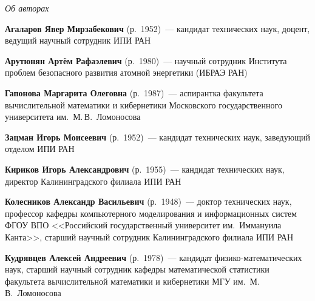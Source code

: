 \begin{center}\LARGE
\textit{Об авторах}
\end{center}
\thispagestyle{empty}

\vspace*{24pt}

\begin{multicols}{2}


\noindent
\textbf{Агаларов Явер Мирзабекович} (р.\ 1952)~---  кандидат технических наук,
доцент, ведущий научный сотрудник ИПИ РАН

\vspace*{6pt}

\noindent
\textbf{Арутюнян Артём Рафаэлевич} (р.\ 1980)~--- научный
сотрудник Института проблем безопасного развития атомной энергетики 
(ИБРАЭ РАН)

\vspace*{6pt}

\noindent
\textbf{Гапонова Маргарита Олеговна} (р.\ 1987)~--- 
аспирантка факультета вычислительной математики и кибернетики Московского
государственного университета им.\ М.\,В.~Ломоносова

\vspace*{6pt}

\noindent
\textbf{Зацман Игорь Моисеевич} (р.\ 1952)~---   кандидат технических наук, 
заведующий отделом ИПИ РАН

\vspace*{6pt}


\noindent
\textbf{Кириков Игорь Александрович} (р.\ 1955)~--- кандидат технических наук, 
директор Калининградского филиала ИПИ РАН

\vspace*{6pt}

\noindent
\textbf{Колесников Александр Васильевич} (р.\ 1948)~--- доктор технических наук, 
профессор кафедры компьютерного моделирования и информационных систем 
ФГОУ ВПО <<Российский государственный университет им.\ Иммануила Канта>>, 
старший научный сотрудник Калининградского филиала ИПИ РАН 

\vspace*{6pt}

\noindent
\textbf{Кудрявцев Алексей Андреевич} (р.\ 1978)~--- кандидат физико-математических наук,
старший научный сотрудник кафедры математической ста\-ти\-сти\-ки факультета вычислительной 
математики и\linebreak
 кибернетики МГУ им.\ М.\,В.~Ломоносова
 


\end{multicols}
